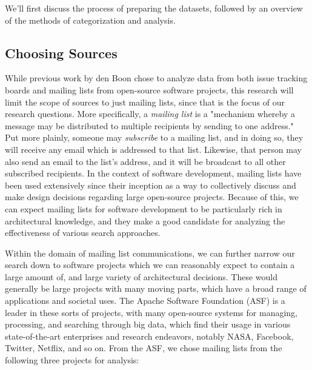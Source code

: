 \documentclass[a4paper, 12pt]{article}
\begin{document}
	We'll first discuss the process of preparing the datasets, followed by an overview of the methods of categorization and analysis.
	
	\subsection{Choosing Sources}
		While previous work by den Boon chose to analyze data from both issue tracking boards and mailing lists from open-source software projects\cite{denboon}, this research will limit the scope of sources to just mailing lists, since that is the focus of our research questions. More specifically, a \textit{mailing list} is a "mechanism whereby a message may be distributed to multiple recipients by sending to one address."\cite{mailinglistrfc} Put more plainly, someone may \textit{subscribe} to a mailing list, and in doing so, they will receive any email which is addressed to that list. Likewise, that person may also send an email to the list's address, and it will be broadcast to all other subscribed recipients. In the context of software development, mailing lists have been used extensively since their inception as a way to collectively discuss and make design decisions regarding large open-source projects. Because of this, we can expect mailing lists for software development to be particularly rich in architectural knowledge, and they make a good candidate for analyzing the effectiveness of various search approaches.
		
		Within the domain of mailing list communications, we can further narrow our search down to software projects which we can reasonably expect to contain a large amount of, and large variety of architectural decisions. These would generally be large projects with many moving parts, which have a broad range of applications and societal uses. The Apache Software Foundation (ASF) is a leader in these sorts of projects, with many open-source systems for managing, processing, and searching through big data, which find their usage in various state-of-the-art enterprises and research endeavors, notably NASA, Facebook, Twitter, Netflix, and so on\cite{akhtar}. From the ASF, we chose mailing lists from the following three projects for analysis:
		
\end{document}
